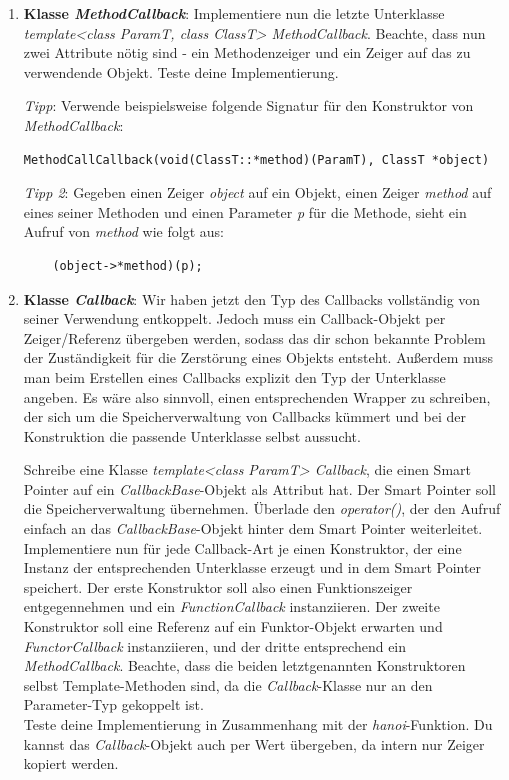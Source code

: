 \begin{enumerate}
\item
\textbf{Klasse \emph{MethodCallback}}:
Implementiere nun die letzte Unterklasse \emph{template<class ParamT, class ClassT> MethodCallback}.
Beachte, dass nun zwei Attribute nötig sind - ein Methodenzeiger und ein Zeiger auf das zu verwendende Objekt.
Teste deine Implementierung.

\emph{Tipp}: Verwende beispielsweise folgende Signatur für den Konstruktor von \emph{MethodCallback}:
\begin{lstlisting}
MethodCallCallback(void(ClassT::*method)(ParamT), ClassT *object)
\end{lstlisting}

\emph{Tipp 2}: Gegeben einen Zeiger \emph{object} auf ein Objekt, einen Zeiger \emph{method} auf eines seiner Methoden und einen Parameter \emph{p} für die Methode, sieht ein Aufruf von \emph{method} wie folgt aus:
\begin{lstlisting}
	(object->*method)(p);
\end{lstlisting}

\item
\textbf{Klasse \emph{Callback}}: 
Wir haben jetzt den Typ des Callbacks vollständig von seiner Verwendung entkoppelt.
Jedoch muss ein Callback-Objekt per Zeiger/Referenz übergeben werden, sodass das dir schon bekannte  Problem der Zuständigkeit für die Zerstörung eines Objekts entsteht.
Außerdem muss man beim Erstellen eines Callbacks explizit den Typ der Unterklasse angeben.
Es wäre also sinnvoll, einen entsprechenden Wrapper zu schreiben, der sich um die Speicherverwaltung von Callbacks kümmert und bei der Konstruktion die passende Unterklasse selbst aussucht.

Schreibe eine Klasse \emph{template<class ParamT> Callback}, die einen Smart Pointer auf ein \emph{CallbackBase}-Objekt als Attribut hat. Der Smart Pointer soll die Speicherverwaltung übernehmen. Überlade den \emph{operator()}, der den Aufruf einfach an das \emph{CallbackBase}-Objekt hinter dem Smart Pointer weiterleitet. \\

Implementiere nun für jede Callback-Art je einen Konstruktor, der eine Instanz der entsprechenden Unterklasse erzeugt und in dem Smart Pointer speichert.
Der erste Konstruktor soll also einen Funktionszeiger entgegennehmen und ein \emph{FunctionCallback} instanziieren.
Der zweite Konstruktor soll eine Referenz auf ein Funktor-Objekt erwarten und  \emph{FunctorCallback} instanziieren, und der dritte entsprechend ein \emph{MethodCallback}.
Beachte, dass die beiden letztgenannten Konstruktoren selbst Template-Methoden sind, da die \emph{Callback}-Klasse nur an den Parameter-Typ gekoppelt ist.\\

Teste deine Implementierung in Zusammenhang mit der \emph{hanoi}-Funktion. Du kannst das \emph{Callback}-Objekt auch per Wert übergeben, da intern nur Zeiger kopiert werden. 

\end{enumerate}

